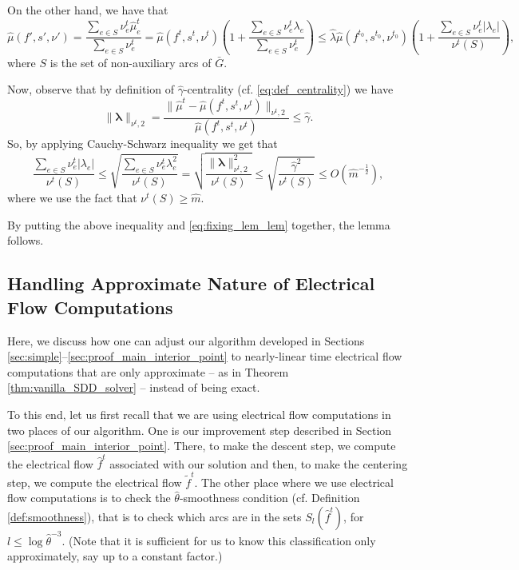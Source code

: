 \documentclass[11pt, letterpaper]{article}
\newcommand{\norm}[2]{\|#1\|_{#2}}
\newcommand{\oG}{\bar{G}}
\newcommand{\hm}{\widehat{m}}
\newcommand{\Cset}[2]{S_{#1}(#2)}
\newcommand{\hmu}{\hat{\mu}}
\newcommand{\hgamma}{\hat{\gamma}}
\newcommand{\htheta}{\hat{\theta}}
\newcommand{\hlambda}{\hat{\lambda}}
\newcommand{\vnu}{\boldsymbol{\mathit{\nu}}}
\newcommand{\hvmu}{\boldsymbol{\mathit{\hat{\mu}}}}
\newcommand{\vlambda}{\boldsymbol{\lambda}}
\newcommand{\ff}{\boldsymbol{\mathit{f}}}
\newcommand{\tff}{\boldsymbol{\mathit{\tilde{f}}}}
\newcommand{\hff}{\boldsymbol{\mathit{\hat{f}}}}
\renewcommand{\ss}{\boldsymbol{\mathit{s}}}
\begin{document}
On the other hand, we have that
\begin{equation}\label{eq:fixing_lem_lem}
\hmu(\ff',\ss',\vnu')=\frac{\sum_{e\in S} \nu_e^t \hmu_e^t}{\sum_{e\in S} \nu_e^t }= \hmu(\ff^{t},\ss^{t},\vnu^{t}) \left(1+ \frac{\sum_{e\in S} \nu_e^t \lambda_e }{\sum_{e\in S} \nu_e^t}\right)\leq \hlambda\hmu(\ff^{t_0},\ss^{t_0},\vnu^{t_0})\left(1+ \frac{\sum_{e\in S} \nu_e^t |\lambda_e| }{\vnu^t(S)}\right),
\end{equation}
where $S$ is the set of non-auxiliary arcs of $\oG$. 

Now, observe that by definition of $\hgamma$-centrality (cf. \eqref{eq:def_centrality}) we have
\[
\norm{\vlambda}{\vnu^t,2}=\frac{\norm{\hvmu^t-\hmu(\ff^t,\ss^t,\vnu^t)}{\vnu^t,2}}{\hmu(\ff^t,\ss^t,\vnu^t)}\leq \hgamma.
\]
So, by applying Cauchy-Schwarz inequality we get that
\[
\frac{\sum_{e\in S} \nu_e^t |\lambda_e|}{\vnu^t(S)}\leq \sqrt{\frac{\sum_{e\in S}\nu_e^t \lambda_e^2}{\vnu^t(S)}}=\sqrt{\frac{\norm{\vlambda}{\vnu^t,2}^2}{\vnu^t(S)}}\leq \sqrt{\frac{\hgamma^2}{\vnu^t(S)}}\leq O(\hm^{-\frac{1}{2}}),
\]
where we use the fact that $\vnu^t(S)\geq \hm$. 

By putting the above inequality and \eqref{eq:fixing_lem_lem} together, the lemma follows.


 

\subsection{Handling Approximate Nature of Electrical Flow Computations}\label{app:inexact_elec_flow_disc}



Here, we discuss how one can adjust our algorithm developed in Sections \ref{sec:simple}--\ref{sec:proof_main_interior_point} to nearly-linear time electrical flow computations that are only approximate -- as in Theorem \ref{thm:vanilla_SDD_solver} -- instead of being exact. 

To this end, let us first recall that we are using electrical flow computations in two places of our algorithm. One is our improvement step described in Section \ref{sec:proof_main_interior_point}. There, to make the descent step, we compute the electrical flow $\hff^t$ associated with our solution and then, to make the centering step, we compute the electrical flow $\tff^t$. The other place where we use electrical flow computations is to check the $\htheta$-smoothness condition (cf. Definition \ref{def:smoothness}), that is to check which arcs are in the sets $\Cset{l}{\hff^t}$, for $l\leq \log \htheta^{-3}$. (Note that it is sufficient for us to know this classification only approximately, say up to a constant factor.)
\end{document}
